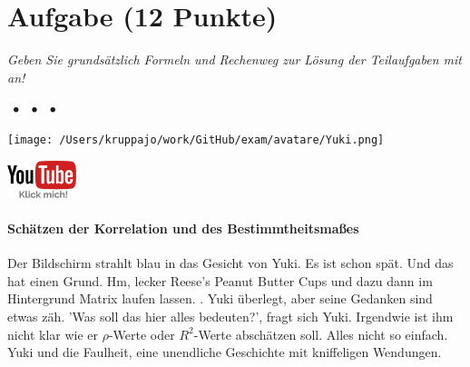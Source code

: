 \documentclass[a4paper, 9pt]{scrartcl}\usepackage[]{graphicx}\usepackage[]{xcolor}
\begin{document}
\clearpage

\section{Aufgabe \hfill (12 Punkte)}

\textit{Geben Sie grundsätzlich Formeln und Rechenweg zur Lösung der Teilaufgaben mit an!} \\[1Ex]
 

 
\ifcollection
\begin{flushright}
\tiny\vspace{-3Ex}
\textbf{\examinhaltstart}
\exammodulestat $\;\bullet$
\exammodulestatbbv $\;\bullet$
\exammodulestatversuch $\;\bullet$
\exammodulebiostat
\vspace{-4Ex}
\end{flushright}
\begin{minipage}[t]{0.5\textwidth}
\texttt{[image: /Users/kruppajo/work/GitHub/exam/avatare/Yuki.png]}
\end{minipage}
\begin{minipage}[t]{0.5\textwidth}
\hfill
\href{https://youtu.be/2QJa19ZwLls}{\includegraphics[width = 2cm]{img/youtube}}
\end{minipage}
\vspace{-3ex}
\fi



\ifcollection
\paragraph{Schätzen der Korrelation und des Bestimmtheitsmaßes}
\fi

Der Bildschirm strahlt blau in das Gesicht von Yuki. Es ist schon spät. Und das hat einen Grund. Hm, lecker Reese's Peanut Butter Cups und dazu dann im Hintergrund Matrix laufen lassen. . Yuki überlegt, aber seine Gedanken sind etwas zäh. 'Was soll das hier alles bedeuten?', fragt sich Yuki. Irgendwie ist ihm nicht klar wie er $\rho$-Werte oder $R^2$-Werte abschätzen soll. Alles nicht so einfach. Yuki und die Faulheit, eine unendliche Geschichte mit kniffeligen Wendungen. 
\vspace{2Ex}
\end{document}
